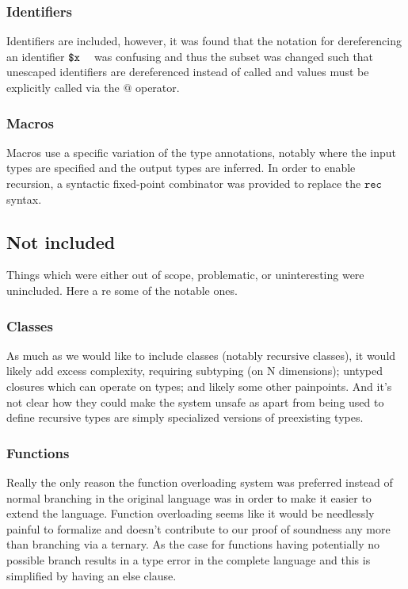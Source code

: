 \documentclass[acmsmall, review]{acmart}
\theoremstyle{definition}
\begin{document}
\subsubsection{Identifiers}
Identifiers are included, however, it was found that the notation for 
dereferencing an identifier $\texttt{\$x}~\texttt{~}$ was confusing and
thus the subset was changed such that unescaped identifiers are dereferenced instead of 
called and values must be explicitly called via the $\texttt{@}$
operator.

\subsubsection{Macros}
Macros use a specific variation of the type annotations, notably where the
input types are specified and the output types are inferred. In order to 
enable recursion, a syntactic fixed-point combinator was provided to replace
the $\texttt{rec}$ syntax.

\subsection{Not included}
Things which were either out of scope, problematic, or uninteresting were unincluded. Here a re some of the notable ones.

\subsubsection{Classes}
As much as we would like to include classes (notably recursive classes), it 
would likely add excess complexity, requiring subtyping (on N dimensions); 
untyped closures which can operate on types; and likely some other painpoints.
And it's not clear how they could make the system unsafe as apart from being
used to define recursive types are simply specialized versions of preexisting
types.

\subsubsection{Functions}
Really the only reason the function overloading system was preferred instead
of normal branching in the original language was in order to make it easier 
to extend the language. Function overloading seems like it would be needlessly
painful to formalize and doesn't contribute to our proof of soundness any more
than branching via a ternary. As the case for functions having potentially no
possible branch results in a type error in the complete language and this is
simplified by having an else clause.
\end{document}
